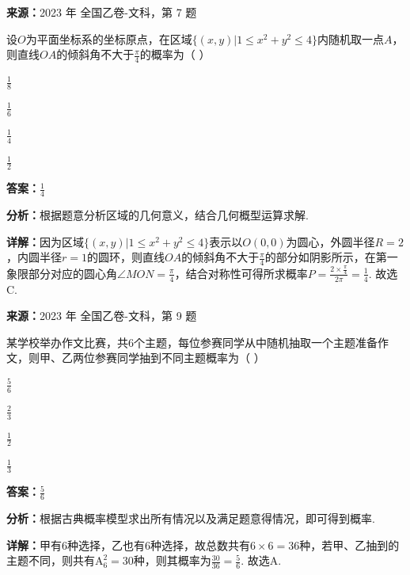 \begin{question}[points=5]
\textbf{来源：}2023 年 全国乙卷-文科，第 7 题\par
设$O$为平面坐标系的坐标原点，在区域$\{(x,y)|1\le x^2+y^2\le 4\}$内随机取一点$A$，则直线$OA$的倾斜角不大于$\frac{\pi}{4}$的概率为（   ）
\begin{choices}
  \item $\frac{1}{8}$
  \item $\frac{1}{6}$
  \item $\frac{1}{4}$
  \item $\frac{1}{2}$
\end{choices}
\begin{solution}
\textbf{答案：}$\frac{1}{4}$

\textbf{分析：}根据题意分析区域的几何意义，结合几何概型运算求解.

\textbf{详解：}因为区域$\{(x,y)|1\le x^2+y^2\le 4\}$表示以$O(0,0)$为圆心，外圆半径$R=2$，内圆半径$r=1$的圆环，则直线$OA$的倾斜角不大于$\frac{\pi}{4}$的部分如阴影所示，在第一象限部分对应的圆心角$\angle MON=\frac{\pi}{4}$，结合对称性可得所求概率$P=\frac{2\times\frac{\pi}{4}}{2\pi}=\frac{1}{4}$. 故选C.
\end{solution}
\end{question}

\begin{question}[points=5]
\textbf{来源：}2023 年 全国乙卷-文科，第 9 题\par
某学校举办作文比赛，共6个主题，每位参赛同学从中随机抽取一个主题准备作文，则甲、乙两位参赛同学抽到不同主题概率为（   ）
\begin{choices}
  \item $\frac{5}{6}$
  \item $\frac{2}{3}$
  \item $\frac{1}{2}$
  \item $\frac{1}{3}$
\end{choices}
\begin{solution}
\textbf{答案：}$\frac{5}{6}$

\textbf{分析：}根据古典概率模型求出所有情况以及满足题意得情况，即可得到概率.

\textbf{详解：}甲有6种选择，乙也有6种选择，故总数共有$6\times6=36$种，若甲、乙抽到的主题不同，则共有$\mathrm{A}_6^2=30$种，则其概率为$\frac{30}{36}=\frac{5}{6}$. 故选A.
\end{solution}
\end{question}

